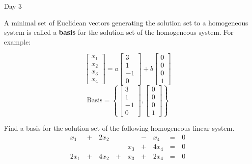 \begin{applicationActivities}{Day 3}
\begin{definition}
  A minimal set of Euclidean vectors generating the solution set to a
  homogeneous system is called a \textbf{basis} for the solution
  set of the homogeneous system. For example:
  \begin{multicols}{2}\noindent
  \[
    \begin{bmatrix}
      x_1 \\
      x_2 \\
      x_3 \\
      x_4
    \end{bmatrix}=
    a\begin{bmatrix}
      3 \\
      1 \\
      -1 \\
      0
    \end{bmatrix}+
    b\begin{bmatrix}
      0 \\
      0 \\
      0 \\
      1
    \end{bmatrix}
  \]
  \[
    \textrm{Basis}=\left\{
    \begin{bmatrix}
      3 \\
      1 \\
      -1 \\
      0
    \end{bmatrix},
    \begin{bmatrix}
      0 \\
      0 \\
      0 \\
      1
    \end{bmatrix}\right\}
  \]
  \end{multicols}
\end{definition}

\begin{activity}{10}
  Find a basis for the solution set of the following homogeneous linear
  system.
  \begin{alignat*}{5}
    x_1 &\,+\,& 2x_2 &\, \,&     &\,-\,&  x_4 &\,=\,& 0 \\
        &\, \,&      &\, \,& x_3 &\,+\,& 4x_4 &\,=\,& 0 \\
   2x_1 &\,+\,& 4x_2 &\,+\,& x_3 &\,+\,& 2x_4 &\,=\,& 0 \\
  \end{alignat*}
\end{activity}




\end{applicationActivities}
